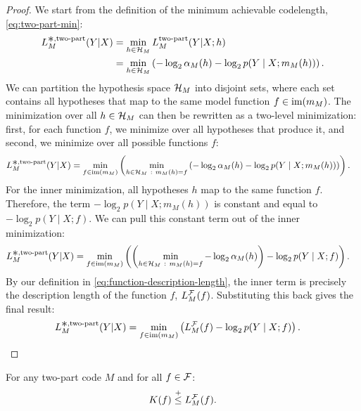 \begin{proof}
We start from the definition of the minimum achievable codelength, \eqref{eq:two-part-min}:
\begin{align*}
    L_M^{\bigast,\text{two-part}}(Y|X) &= \min_{h \in \gH_M} L_M^{\text{two-part}}(Y|X;h) \\
    &= \min_{h \in \gH_M} \left( -\log_2 \alpha_M(h) - \log_2 p(Y \mid X; m_M(h)) \right).
\end{align*}
We can partition the hypothesis space ${\mathcal{H}}_M$ into disjoint sets, where each set contains all hypotheses that map to the same model function $f \in \operatorname{im}(m_M)$. The minimization over all $h \in {\mathcal{H}}_M$ can then be rewritten as a two-level minimization: first, for each function $f$, we minimize over all hypotheses that produce it, and second, we minimize over all possible functions $f$:
\begin{align*}
    L_M^{\bigast,\text{two-part}}(Y|X) &= \min_{f \in \im(m_M)} \left( \min_{h \in \gH_M  ~:~ m_M(h)=f} \left( -\log_2 \alpha_M(h) - \log_2 p(Y \mid X; m_M(h)) \right) \right).
\end{align*}
For the inner minimization, all hypotheses $h$ map to the same function $f$. Therefore, the term $-\log_2 p(Y \mid X; m_M(h))$ is constant and equal to $-\log_2 p(Y \mid X; f)$. We can pull this constant term out of the inner minimization:
\begin{align*}
    L_M^{\bigast,\text{two-part}}(Y|X) &= \min_{f \in \im(m_M)} \left( \left( \min_{h \in \gH_M  ~:~ m_M(h)=f} -\log_2 \alpha_M(h) \right) - \log_2 p(Y \mid X; f) \right).
\end{align*}
By our definition in \eqref{eq:function-description-length}, the inner term is precisely the description length of the function $f$, $L^{\mathcal{F}}_M(f)$. Substituting this back gives the final result:
\begin{align*}
    L_M^{\bigast,\text{two-part}}(Y|X) &= \min_{f \in \im(m_M)} \left( L^\gF_M(f) - \log_2 p(Y \mid X; f) \right). \qedhere
\end{align*}
\end{proof}

\begin{lemma}
\label{lemma-two-part-f2}
For any two-part code $M$ and for all $f \in {\mathcal{F}}$:
\begin{equation}
    K(f) \leqc L^\gF_M(f)
    \label{eq:two-part-as-function-of-f2}.
\end{equation}
\end{lemma}

